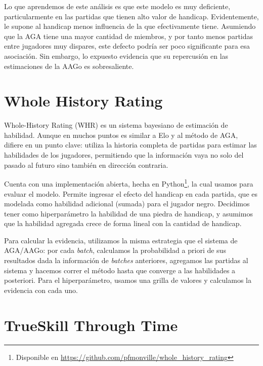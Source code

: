 \documentclass[a4paper,10pt]{report}
\begin{document}
Lo que aprendemos de este análisis es que este modelo es muy deficiente, particularmente en las partidas que tienen alto valor de handicap.
Evidentemente, le supone al handicap menos influencia de la que efectivamente tiene.
Asumiendo que la AGA tiene una mayor cantidad de miembros, y por tanto menos partidas entre jugadores muy dispares, este defecto podría ser poco significante para esa asociación.
Sin embargo, lo expuesto evidencia %
que su repercusión en las estimaciones de la AAGo es sobresaliente.




\section*{Whole History Rating}

Whole-History Rating (WHR)  es un sistema bayesiano de estimación de habilidad. Aunque en muchos puntos es similar a Elo y al método de AGA, difiere en un punto clave: utiliza la historia completa de partidas para estimar las habilidades de los jugadores, permitiendo que la información vaya no solo del pasado al futuro sino también en dirección contraria.

Cuenta con una implementación abierta, hecha en Python\footnote{Disponible en \url{https://github.com/pfmonville/whole_history_rating}}, la cual usamos para evaluar el modelo. Permite ingresar el efecto del handicap en cada partida, que es modelada como habilidad adicional (sumada) para el jugador negro. Decidimos tener como hiperparámetro la habilidad de una piedra de handicap, y asumimos que la habilidad agregada crece de forma lineal con la cantidad de handicap.

Para calcular la evidencia, utilizamos la misma estrategia que el sistema de AGA/AAGo: por cada \textit{batch}, calculamos la probabilidad a priori de sus resultados dada la información de \textit{batches} anteriores, agregamos las partidas al sistema y hacemos correr el método hasta que converge a las habilidades a posteriori. Para el hiperparámetro, usamos una grilla de valores y calculamos la evidencia con cada uno.

\section*{TrueSkill Through Time}


\end{document}
